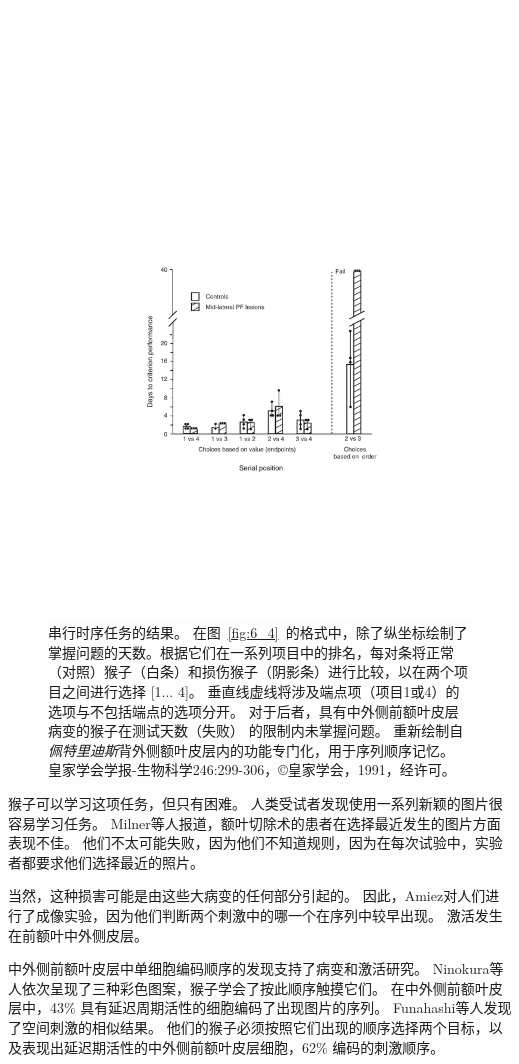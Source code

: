 \begin{figure}
	\centering
	\includegraphics[width=0.5\linewidth]{chap6/6_5}
	\caption{串行时序任务的结果。
		在图~\ref{fig:6_4}~的格式中，除了纵坐标绘制了掌握问题的天数。根据它们在一系列项目中的排名，每对条将正常（对照）猴子（白条）和损伤猴子（阴影条）进行比较，以在两个项目之间进行选择 [1... 4]。
		垂直线虚线将涉及端点项（项目1或4）的选项与不包括端点的选项分开。
		对于后者，具有中外侧前额叶皮层病变的猴子在测试天数（失败） 的限制内未掌握问题。
		重新绘制自\textit{佩特里迪斯}背外侧额叶皮层内的功能专门化，用于序列顺序记忆。
		皇家学会学报-生物科学246:299-306，©皇家学会，1991，经许可。}
	\label{fig:6_5}
\end{figure}


猴子可以学习这项任务，但只有困难。
人类受试者发现使用一系列新颖的图片很容易学习任务。
Milner等人\cite{milner1985frontal}报道，额叶切除术的患者在选择最近发生的图片方面表现不佳。
他们不太可能失败，因为他们不知道规则，因为在每次试验中，实验者都要求他们选择最近的照片。


当然，这种损害可能是由这些大病变的任何部分引起的。
因此，Amiez\cite{amiez2007selective}对人们进行了成像实验，因为他们判断两个刺激中的哪一个在序列中较早出现。
激活发生在前额叶中外侧皮层。


中外侧前额叶皮层中单细胞编码顺序的发现支持了病变和激活研究。
Ninokura等人\cite{ninokura2003representation}依次呈现了三种彩色图案，猴子学会了按此顺序触摸它们。
在中外侧前额叶皮层中，43\% 具有延迟周期活性的细胞编码了出现图片的序列。
Funahashi等人\cite{funahashi1997delay}发现了空间刺激的相似结果。
他们的猴子必须按照它们出现的顺序选择两个目标，以及表现出延迟期活性的中外侧前额叶皮层细胞，62\% 编码的刺激顺序。


